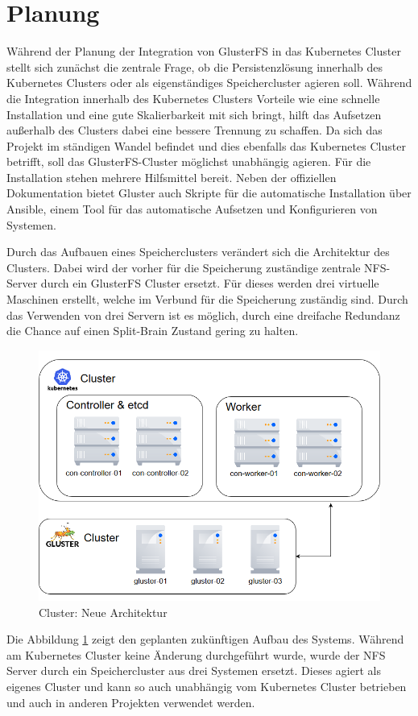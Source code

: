 \section{Planung}
\label{sec:planung}
Während der Planung der Integration von GlusterFS in das Kubernetes Cluster stellt sich zunächst die zentrale Frage, ob die Persistenzlösung innerhalb des Kubernetes Clusters oder als eigenständiges Speichercluster agieren soll. Während die Integration innerhalb des Kubernetes Clusters Vorteile wie eine schnelle Installation und eine gute Skalierbarkeit mit sich bringt, hilft das Aufsetzen außerhalb des Clusters dabei eine bessere Trennung zu schaffen. Da sich das Projekt im ständigen Wandel befindet und dies ebenfalls das Kubernetes Cluster betrifft, soll das GlusterFS-Cluster möglichst unabhängig agieren. Für die Installation stehen mehrere Hilfsmittel bereit. Neben der offiziellen Dokumentation bietet Gluster auch Skripte für die automatische Installation über Ansible, einem Tool für das automatische Aufsetzen und Konfigurieren von Systemen. \medskip

Durch das Aufbauen eines Speicherclusters verändert sich die Architektur des Clusters. Dabei wird der vorher für die Speicherung zuständige zentrale NFS-Server durch ein GlusterFS Cluster ersetzt. Für dieses werden drei virtuelle Maschinen erstellt, welche im Verbund für die Speicherung zuständig sind. Durch das Verwenden von drei Servern ist es möglich, durch eine dreifache Redundanz die Chance auf einen Split-Brain Zustand gering zu halten.
\begin{figure}[htb]
\centering
\includegraphics[width=1\textwidth,angle=0]{gfx/cluster_neu.png}
\caption[Cluster: Neue Architektur]{Cluster: Neue Architektur}
\label{fig:clusterneu}
\end{figure}
Die Abbildung \ref{fig:clusterneu} zeigt den geplanten zukünftigen Aufbau des Systems. Während am Kubernetes Cluster keine Änderung durchgeführt wurde, wurde der NFS Server durch ein Speichercluster aus drei Systemen ersetzt. Dieses agiert als eigenes Cluster und kann so auch unabhängig vom Kubernetes Cluster betrieben und auch in anderen Projekten verwendet werden. 


